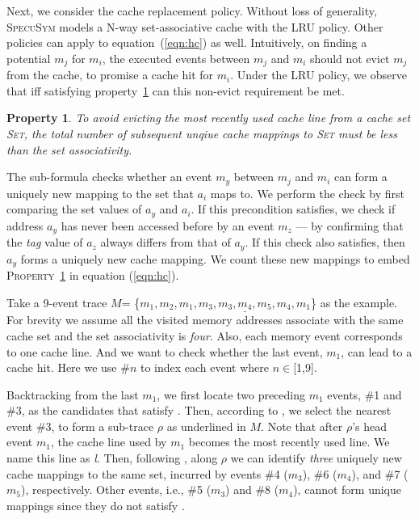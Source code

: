 \documentclass[sigconf]{acmart}
\newcommand*\circled[1]{\tikz[baseline=(char.base)]{
				\node[shape=circle,draw,inner sep=1pt] (char) {\scriptsize{#1}};}}
\newcommand{\SpecuSym}{\textsc{SpecuSym} }
\newtheorem{pro}{Property}
\begin{document}
Next, we consider the cache replacement policy. Without loss of generality, 
\SpecuSym models a N-way set-associative cache with the LRU policy. Other 
policies can apply to equation~(\ref{eqn:hc}) as well. Intuitively, on 
finding a potential $\mathit{m_j}$ for $\mathit{m_i}$, the executed events 
between $\mathit{m_j}$ and $\mathit{m_i}$ should not evict $\mathit{m_j}$ 
from the cache, to promise a cache hit for $\mathit{m_i}$. Under the LRU 
policy, we observe that iff satisfying property~\ref{pro:p1} can this 
non-evict requirement be met.
%
\begin{pro}
  \label{pro:p1}
  To avoid evicting the most recently used cache line from a cache set 
  \textsc{Set}, the total number of subsequent unqiue cache mappings to 
  \textsc{Set} must be less than the set associativity.
\end{pro}
%
The sub-formula \circled{6} checks whether an event $\mathit{m_y}$ between 
$\mathit{m_j}$ and $\mathit{m_i}$ can form a uniquely new mapping to the set 
that $\mathit{a_i}$ maps to. We perform the check by first comparing the 
set values of $\mathit{a_y}$ and $\mathit{a_i}$. If this precondition satisfies, 
we check if address $\mathit{a_y}$ has never been accessed before by an event
$\mathit{m_z}$ --- by confirming that the \emph{tag} value of $\mathit{a_z}$ 
always differs from that of $\mathit{a_y}$. If this check also satisfies, then 
$\mathit{a_y}$ forms a uniquely new cache mapping. We count these new 
mappings to embed \textsc{Property}~\ref{pro:p1} in equation (\ref{eqn:hc}).


Take a 9-event trace $\mathit{M}$=
\{$\mathit{m_1,m_2,\underline{m_1,m_3,m_3,m_4,m_5,m_4,m_1}}$\} as the example. For 
brevity we assume all the visited memory addresses associate with the same cache 
set and the set associativity is \textit{four}. Also, each memory event corresponds 
to one cache line. And we want to check whether the last event, $\mathit{m_1}$, 
can lead to a cache hit. Here we use \#$n$ to index each event where $n\in$[1,9].


Backtracking from the last $\mathit{m_1}$, we first locate two preceding
$\mathit{m_1}$ events, \#1 and \#3, as the candidates that satisfy \circled{4}. 
Then, according to \circled{5}, we select the nearest event \#3, to form a 
sub-trace $\rho$ as underlined in $\mathit{M}$. Note that after $\rho$'s 
head event $\mathit{m_1}$, the cache line used by $\mathit{m_1}$ becomes 
the most recently used line. We name this line as \emph{l}. Then, following 
\circled{6}, along $\rho$ we can identify \emph{three} uniquely new cache 
mappings to the same set, incurred by events \#4 ($\mathit{m_3}$), \#6 
($\mathit{m_4}$), and \#7 ($\mathit{m_5}$), respectively. Other events,
i.e., \#5 ($\mathit{m_3}$) and \#8 ($\mathit{m_4}$), cannot form unique
mappings since they do not satisfy \circled{6}.
\end{document}

